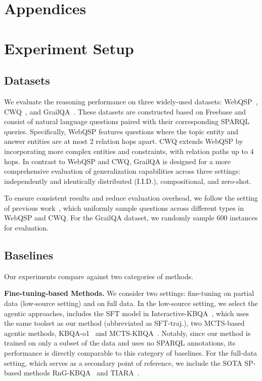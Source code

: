 \section{Appendices}

\appendix

\section{Experiment Setup}
\label{app:setup}
\subsection{Datasets}
We evaluate the reasoning performance on three widely-used datasets: WebQSP~\citep{talmor2018web}, CWQ~\citep{talmor2018web}, and GrailQA~\citep{gu2021beyond}. These datasets are constructed based on Freebase and consist of natural language questions paired with their corresponding SPARQL queries. Specifically, WebQSP features questions where the topic entity and answer entities are at most 2 relation hops apart. CWQ extends WebQSP by incorporating more complex entities and constraints, with relation paths up to 4 hops. In contrast to WebQSP and CWQ, GrailQA is designed for a more comprehensive evaluation of generalization capabilities across three settings: independently and identically distributed (I.I.D.), compositional, and zero-shot.

To ensure consistent results and reduce evaluation overhead, we follow the setting of previous work~\citet{xiong2024interactive}, which uniformly sample questions across different types in WebQSP and CWQ. For the GrailQA dataset, we randomly sample 600 instances for evaluation.
\subsection{Baselines}
Our experiments compare \ours \space against two categories of methods.

\textbf{Fine-tuning-based Methods.} We consider two settings: fine-tuning on partial data (low-source setting) and on full data. In the low-source setting, we select the agentic approaches, includes the SFT model in Interactive-KBQA~\citep{xiong2024interactive}, which uses the same toolset as our method (abbreviated as SFT-traj.), two MCTS-based agentic methods, KBQA-o1~\citep{luokbqao1} and MCTS-KBQA~\citep{xiong2025mcts}. Notably, since our method is trained on only a subset of the data and uses no SPARQL annotations, its performance is directly comparable to this category of baselines.
For the full-data setting, which serves as a secondary point of reference, we include the SOTA SP-based methods RnG-KBQA~\citep{ye2022rng} and TIARA~\citep{shu2022tiara}.

